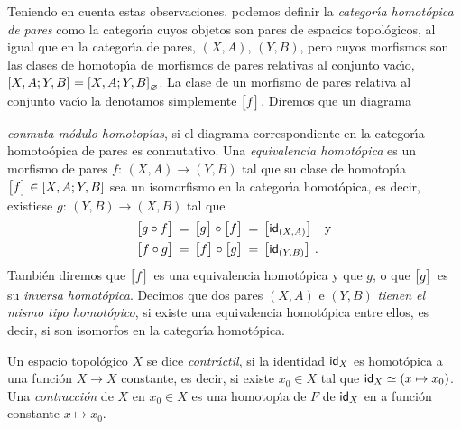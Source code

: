 Teniendo en cuenta estas observaciones, podemos definir la
\emph{categor\'{\i}a homot\'{o}pica de pares} como la categor\'{\i}a cuyos
objetos son pares de espacios topol\'{o}gicos, al igual que en la
categor\'{\i}a de pares, $(X,A)$, $(Y,B)$, pero cuyos morfismos son las clases
de homotop\'{\i}a de morfismos de pares relativas al conjunto vac\'{\i}o,
$\homotopicas{X,A}{Y,B}=\homotopicas[\varnothing]{X,A}{Y,B}$. La clase de un
morfismo de pares relativa al conjunto vac\'{\i}o la denotamos simplemente
$\clase{f}$. Diremos que un diagrama
\begin{center}
\end{center}
\emph{conmuta m\'{o}dulo homotop\'{\i}as}, si el diagrama correspondiente en
la categor\'{\i}a homoto\'{o}pica de pares es conmutativo. Una
\emph{equivalencia homot\'{o}pica} es un morfismo de pares
$f:\,(X,A)\rightarrow (Y,B)$ tal que su clase de homotop\'{\i}a
$\clase{f}\in\homotopicas{X,A}{Y,B}$ sea un isomorfismo en la categor\'{\i}a
homot\'{o}pica, es decir, existiese $g:\,(Y,B)\rightarrow (X,B)$ tal que
\begin{align*}
	\clase{g\circ f} & \,=\,\clase{g}\circ\clase{f} \,=\,
		\clase{\id[(X,A)]} \quad\text{y} \\
	\clase{f\circ g} & \,=\,\clase{f}\circ\clase{g} \,=\,
		\clase{\id[(Y,B)]}
	\text{ .}
\end{align*}
%
Tambi\'{e}n diremos que $\clase{f}$ es una equivalencia homot\'{o}pica y que
$g$, o que $\clase{g}$ es su \emph{inversa homot\'{o}pica}. Decimos que dos
pares $(X,A)$ e $(Y,B)$ \emph{tienen el mismo tipo homot\'{o}pico}, si
existe una equivalencia homot\'{o}pica entre ellos, es decir, si son isomorfos
en la categor\'{\i}a homot\'{o}pica.

Un espacio topol\'{o}gico $X$ se dice \emph{contr\'{a}ctil}, si la identidad
$\id[X]$ es homot\'{o}pica a una funci\'{o}n $X\rightarrow X$ constante, es
decir, si existe $x_{0}\in X$ tal que $\id[X]\simeq (x\mapsto x_{0})$. Una
\emph{contracci\'{o}n} de $X$ en $x_{0}\in X$ es una homotop\'{\i}a
de $F$ de $\id[X]$ en a funci\'{o}n constante $x\mapsto x_{0}$.

